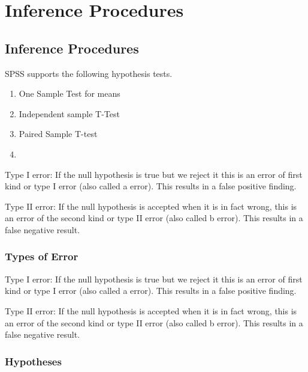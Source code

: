 \documentclass[12pt, a4paper]{report}
\begin{document}


\newpage
\chapter{Inference Procedures}
\section{Inference Procedures}

SPSS supports the following hypothesis tests.
\begin{enumerate}
\item One Sample Test for means
\item Independent sample T-Test
\item Paired Sample T-test
\item
\end{enumerate}


\begin{minipage}[b]{0.5\linewidth}
Type I error: If the null hypothesis is true but we reject it this is an error of first kind or type I error (also called a error). This results in a false positive finding.

Type II error: If the null hypothesis is accepted when it is in fact wrong, this is an error of the second kind or type II error (also called b error). This results in a false negative result.
\end{minipage}

\subsection{Types of Error}
Type I error: If the null hypothesis is true but we reject it this is an error of first kind or type I error (also called a error). This results in a false positive finding.

Type II error: If the null hypothesis is accepted when it is in fact wrong, this is an error of the second kind or type II error (also called b error). This results in a false negative result.

\subsection{Hypotheses}
\end{document}

